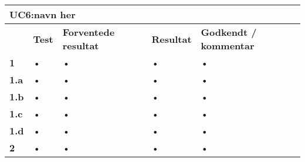 
\begin{longtable}{|p{5mm}|p{40mm}|p{40mm}|p{20mm}|p{25mm}|}
\hline 
\multicolumn{5}{|l|}{\textbf{UC6:navn her}} \\ 
\hline 
& \textbf{Test} & \textbf{Forventede resultat} & \textbf{Resultat} & \textbf{Godkendt / kommentar} \\ 
\hline 
\textbf{1}& • & • & • & • \\ 
\hline 
\textbf{1.a}& • & • & • & • \\ 
\hline 
\textbf{1.b}& • & • & • & • \\ 
\hline 
\textbf{1.c}& • & • & • & • \\ 
\hline 
\textbf{1.d}& • & • & • & • \\ 
\hline
\textbf{2}& • & • & • & • \\ 
\hline  
\end{longtable} 